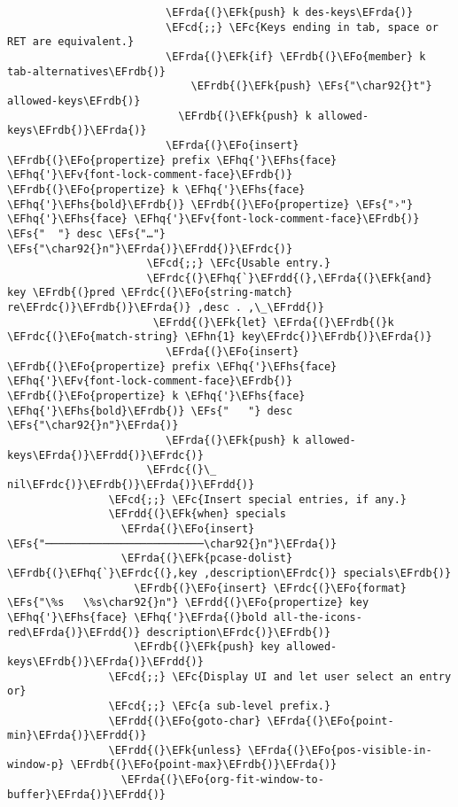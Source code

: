 \documentclass[c]{article}
\theoremstyle{plain}%
\theoremstyle{definition}
\theoremstyle{remark}
\newcommand{\EFc}[1]{\textcolor{EFc}{#1}} %
\newcommand{\EFcd}[1]{\textcolor{EFcd}{#1}} %
\newcommand{\EFs}[1]{\textcolor{EFs}{#1}} %
\newcommand{\EFk}[1]{\textcolor{EFk}{#1}} %
\newcommand{\EFv}[1]{\textcolor{EFv}{#1}} %
\newcommand{\EFo}[1]{\textcolor{EFo}{#1}} %
\newcommand{\EFhn}[1]{\textcolor{EFhn}{#1}} %
\newcommand{\EFhq}[1]{\textcolor{EFhq}{#1}} %
\newcommand{\EFhs}[1]{\textcolor{EFhs}{#1}} %
\newcommand{\EFrda}[1]{\textcolor{EFrda}{#1}} %
\newcommand{\EFrdb}[1]{\textcolor{EFrdb}{#1}} %
\newcommand{\EFrdc}[1]{\textcolor{EFrdc}{#1}} %
\newcommand{\EFrdd}[1]{\textcolor{EFrdd}{#1}} %
\begin{document}
\begin{Code}
\begin{Verbatim}
                         \EFrda{(}\EFk{push} k des-keys\EFrda{)}
                         \EFcd{;;} \EFc{Keys ending in tab, space or RET are equivalent.}
                         \EFrda{(}\EFk{if} \EFrdb{(}\EFo{member} k tab-alternatives\EFrdb{)}
                             \EFrdb{(}\EFk{push} \EFs{"\char92{}t"} allowed-keys\EFrdb{)}
                           \EFrdb{(}\EFk{push} k allowed-keys\EFrdb{)}\EFrda{)}
                         \EFrda{(}\EFo{insert} \EFrdb{(}\EFo{propertize} prefix \EFhq{'}\EFhs{face} \EFhq{'}\EFv{font-lock-comment-face}\EFrdb{)} \EFrdb{(}\EFo{propertize} k \EFhq{'}\EFhs{face} \EFhq{'}\EFhs{bold}\EFrdb{)} \EFrdb{(}\EFo{propertize} \EFs{"›"} \EFhq{'}\EFhs{face} \EFhq{'}\EFv{font-lock-comment-face}\EFrdb{)} \EFs{"  "} desc \EFs{"…"} \EFs{"\char92{}n"}\EFrda{)}\EFrdd{)}\EFrdc{)}
                      \EFcd{;;} \EFc{Usable entry.}
                      \EFrdc{(}\EFhq{`}\EFrdd{(},\EFrda{(}\EFk{and} key \EFrdb{(}pred \EFrdc{(}\EFo{string-match} re\EFrdc{)}\EFrdb{)}\EFrda{)} ,desc . ,\_\EFrdd{)}
                       \EFrdd{(}\EFk{let} \EFrda{(}\EFrdb{(}k \EFrdc{(}\EFo{match-string} \EFhn{1} key\EFrdc{)}\EFrdb{)}\EFrda{)}
                         \EFrda{(}\EFo{insert} \EFrdb{(}\EFo{propertize} prefix \EFhq{'}\EFhs{face} \EFhq{'}\EFv{font-lock-comment-face}\EFrdb{)} \EFrdb{(}\EFo{propertize} k \EFhq{'}\EFhs{face} \EFhq{'}\EFhs{bold}\EFrdb{)} \EFs{"   "} desc \EFs{"\char92{}n"}\EFrda{)}
                         \EFrda{(}\EFk{push} k allowed-keys\EFrda{)}\EFrdd{)}\EFrdc{)}
                      \EFrdc{(}\_ nil\EFrdc{)}\EFrdb{)}\EFrda{)}\EFrdd{)}
                \EFcd{;;} \EFc{Insert special entries, if any.}
                \EFrdd{(}\EFk{when} specials
                  \EFrda{(}\EFo{insert} \EFs{"─────────────────────────\char92{}n"}\EFrda{)}
                  \EFrda{(}\EFk{pcase-dolist} \EFrdb{(}\EFhq{`}\EFrdc{(},key ,description\EFrdc{)} specials\EFrdb{)}
                    \EFrdb{(}\EFo{insert} \EFrdc{(}\EFo{format} \EFs{"\%s   \%s\char92{}n"} \EFrdd{(}\EFo{propertize} key \EFhq{'}\EFhs{face} \EFhq{'}\EFrda{(}bold all-the-icons-red\EFrda{)}\EFrdd{)} description\EFrdc{)}\EFrdb{)}
                    \EFrdb{(}\EFk{push} key allowed-keys\EFrdb{)}\EFrda{)}\EFrdd{)}
                \EFcd{;;} \EFc{Display UI and let user select an entry or}
                \EFcd{;;} \EFc{a sub-level prefix.}
                \EFrdd{(}\EFo{goto-char} \EFrda{(}\EFo{point-min}\EFrda{)}\EFrdd{)}
                \EFrdd{(}\EFk{unless} \EFrda{(}\EFo{pos-visible-in-window-p} \EFrdb{(}\EFo{point-max}\EFrdb{)}\EFrda{)}
                  \EFrda{(}\EFo{org-fit-window-to-buffer}\EFrda{)}\EFrdd{)}

\end{Verbatim}
\end{Code}
\end{document}
